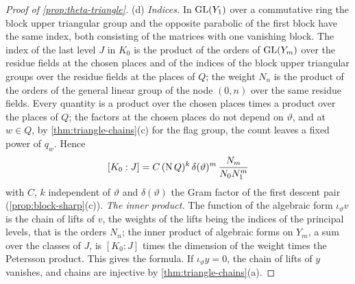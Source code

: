 \begin{proof}[Proof of \cref{prop:theta-triangle}]
(d) \emph{Indices.} In $\operatorname{GL}(Y_1)$ over a commutative ring the block upper triangular group and the opposite parabolic of the first block have the same index, both consisting of the matrices with one vanishing
block. The index of the last level $J$ in $K_0$ is the product of the orders of $\operatorname{GL}(Y_m)$ over the residue fields at the chosen places and of the indices of the block upper triangular groups over the residue
fields at the places of $Q$; the weight $N_n$ is the product of the orders of the general linear group of the node $(0,n)$ over the same residue fields. Every quantity is a product over the chosen places times
a product over the places of $Q$; the factors at the chosen places do not depend on $\vartheta$, and at $w\in Q$, by \cref{thm:triangle-chains}(c) for the flag group, the count leaves a fixed power of $q_w$. Hence
\[
  [K_0:J]=C\,(\operatorname{N} Q)^k\,\delta(\vartheta)^m\,\frac{N_m}{N_0N_1^m}
\]
with $C$, $k$ independent of $\vartheta$ and $\delta(\vartheta)$ the Gram factor of the first descent pair (\cref{prop:block-sharp}(c)). \emph{The inner product.} The function of the algebraic form $\iota_\vartheta v$ is the chain
of lifts of $v$, the weights of the lifts being the indices of the principal levels, that is the orders $N_n$; the inner product of algebraic forms on $Y_m$, a sum over the classes of $J$, is $[K_0:J]$ times the
dimension of the weight times the Petersson product. This gives the formula. If $\iota_\vartheta y=0$, the chain of lifts of $y$ vanishes, and chains are injective by \cref{thm:triangle-chains}(a).
\end{proof}

